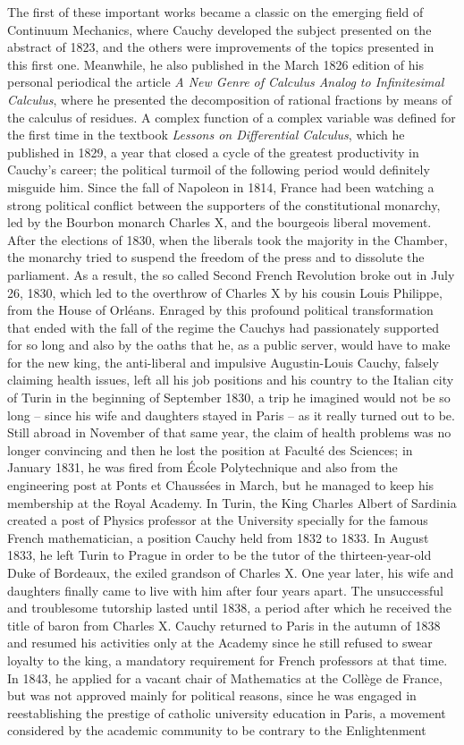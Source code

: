 The first of these important works became a classic on the emerging field of Continuum Mechanics, where Cauchy developed the subject presented on the abstract of 1823, and the others were improvements of the topics presented in this first one. Meanwhile, he also published in the March 1826 edition of his personal periodical the article \emph{A New Genre of Calculus Analog to Infinitesimal Calculus}, where he presented the decomposition of rational fractions by means of the calculus of residues. A complex function of a complex variable was defined for the first time in the textbook \emph{Lessons on Differential Calculus}, which he published in 1829, a year that closed a cycle of the greatest productivity in Cauchy's career; the political turmoil of the following period would definitely misguide him. Since the fall of Napoleon in 1814, France had been watching a strong political conflict between the supporters of the constitutional monarchy, led by the Bourbon monarch Charles X, and the bourgeois liberal movement. After the elections of 1830, when the liberals took the majority in the Chamber, the monarchy tried to suspend the freedom of the press and to dissolute the parliament. As a result, the so called Second French Revolution broke out in July 26, 1830, which led to the overthrow of Charles X by his cousin Louis Philippe, from the House of Orl\'eans. Enraged by this profound political transformation that ended with the fall of the regime the Cauchys had passionately supported for so long and also by the oaths that he, as a public server, would have to make for the new king, the anti-liberal and impulsive Augustin-Louis Cauchy, falsely claiming health issues, left all his job positions and his country to the Italian city of Turin in the beginning of September 1830, a trip he imagined would not be so long -- since his wife and daughters stayed in Paris -- as it really turned out to be. Still abroad in November of that same year, the claim of health problems was no longer convincing and then he lost the position at Facult\'e des Sciences; in January 1831, he was fired from \'Ecole Polytechnique and also from the engineering post at Ponts et Chauss\'ees in March, but he managed to keep his membership at the Royal Academy. In Turin, the King Charles Albert of Sardinia created a post of Physics professor at the University specially for the famous French mathematician, a position Cauchy held from 1832 to 1833. In August 1833, he left Turin to Prague in order to be the tutor of the thirteen-year-old Duke of Bordeaux, the exiled grandson of Charles X. One year later, his  wife and daughters finally came to live with him after four years apart. The unsuccessful and troublesome tutorship lasted until 1838, a period after which he received the title of baron from Charles X. Cauchy returned to Paris in the autumn of 1838 and resumed his activities only at the Academy since he still refused to swear loyalty to the king, a mandatory requirement for French professors at that time. In 1843, he applied for a vacant chair of Mathematics at the Coll\`ege de France, but was not approved mainly for political reasons, since he was engaged in reestablishing the prestige of catholic university education in Paris, a movement considered by the academic community to be contrary to the Enlightenment 